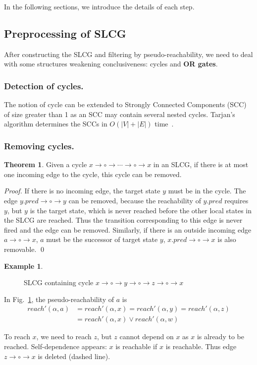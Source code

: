 \documentclass{article}
\theoremstyle{definition}
\newtheorem{theorem}{Theorem}
\newtheorem{example}{Example}
\begin{document}
In the following sections, we introduce the details of each step.

\subsection{Preprocessing of SLCG}\label{sectprecond}
After constructing the SLCG and filtering by pseudo-reachability, we need to deal with some structures weakening conclusiveness: cycles and \textbf{OR gates}.
\subsubsection{Detection of cycles.}
The notion of cycle can be extended to Strongly Connected Components (SCC) of size greater than 1 as an SCC may contain several nested cycles. 
Tarjan's algorithm determines the SCCs in $O(|V|+|E|)$ time~\cite{tarjan1972}. 

\subsubsection{Removing cycles.}
\begin{theorem}\label{th:break_cycle}
Given a cycle $x\to \circ \to \cdots \to \circ \to x$ in an SLCG, if there is at most one incoming edge to the cycle, this cycle can be removed.
\end{theorem}
\begin{proof}
If there is no incoming edge, the target state $y$ must be in the cycle. 
The edge $y.pred\to\circ\to y$ can be removed, because the reachability of $y.pred$ requires $y$, but $y$ is the target state, which is never reached before the other local states in the SLCG are reached.
Thus the transition corresponding to this edge is never fired and the edge can be removed.
Similarly, if there is an outside incoming edge $a\to \circ \to x$, $a$ must be the successor of target state $y$, $x.pred\to\circ\to x$ is also removable.
\qed
\end{proof}


\begin{example}
    \begin{figure}[H]
        \centering
        
        \caption{SLCG containing cycle $x\to \circ \to y \to \circ \to z\to \circ \to x$}
        \label{cycle1}
    \end{figure}
    
    In Fig.~\ref{cycle1}, the pseudo-reachability of $a$ is 
    \begin{align*}
        reach'(\alpha,a)&=reach'(\alpha,x)=reach'(\alpha,y)=reach'(\alpha,z)\\
        &=reach'(\alpha,x)\lor reach'(\alpha,w)
    \end{align*}
    
    To reach $x$, we need to reach $z$, but $z$ cannot depend on $x$ as $x$ is already to be reached. 
    Self-dependence appears: $x$ is reachable if $x$ is reachable.
    Thus edge $z\to \circ \to x$ is deleted (dashed line).
\end{example}
\end{document}
